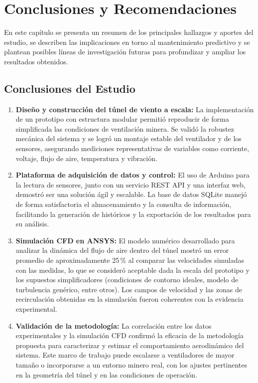 \chapter{Conclusiones y Recomendaciones}

En este capítulo se presenta un resumen de los principales hallazgos y aportes del estudio, se describen las implicaciones en torno al mantenimiento predictivo y se plantean posibles líneas de investigación futuras para profundizar y ampliar los resultados obtenidos.

\section{Conclusiones del Estudio}
\begin{enumerate}
    \item \textbf{Diseño y construcción del túnel de viento a escala:}  
    La implementación de un prototipo con estructura modular permitió reproducir de forma simplificada las condiciones de ventilación minera. Se validó la robustez mecánica del sistema y se logró un montaje estable del ventilador y de los sensores, asegurando mediciones representativas de variables como corriente, voltaje, flujo de aire, temperatura y vibración.

    \item \textbf{Plataforma de adquisición de datos y control:}  
    El uso de Arduino para la lectura de sensores, junto con un servicio REST API y una interfaz web, demostró ser una solución ágil y escalable. La base de datos SQLite manejó de forma satisfactoria el almacenamiento y la consulta de información, facilitando la generación de históricos y la exportación de los resultados para su análisis.

    \item \textbf{Simulación CFD en ANSYS:}  
    El modelo numérico desarrollado para analizar la dinámica del flujo de aire dentro del túnel mostró un error promedio de aproximadamente 25\,\% al comparar las velocidades simuladas con las medidas, lo que se consideró aceptable dada la escala del prototipo y los supuestos simplificadores (condiciones de contorno ideales, modelo de turbulencia genérico, entre otros). Los campos de velocidad y las zonas de recirculación obtenidas en la simulación fueron coherentes con la evidencia experimental.

    \item \textbf{Validación de la metodología:}  
    La correlación entre los datos experimentales y la simulación CFD confirmó la eficacia de la metodología propuesta para caracterizar y estimar el comportamiento aerodinámico del sistema. Este marco de trabajo puede escalarse a ventiladores de mayor tamaño o incorporarse a un entorno minero real, con los ajustes pertinentes en la geometría del túnel y en las condiciones de operación.


\end{enumerate}
